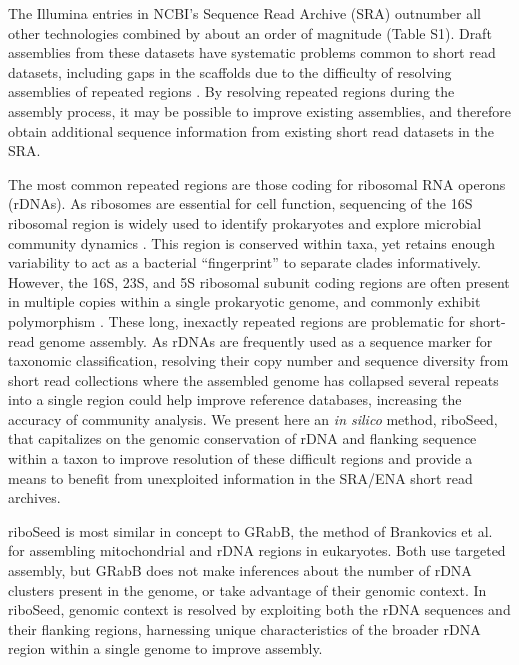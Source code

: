 The Illumina entries in NCBI's Sequence Read Archive (SRA) \cite{Kodama2012a} outnumber all other technologies combined by about an order of magnitude (Table S1). Draft assemblies from these datasets have systematic problems common to short read datasets, including gaps in the scaffolds due to the difficulty of resolving assemblies of repeated regions \cite{Whiteford2005,Treangen2011}. By resolving repeated regions during the assembly process, it may be possible to improve existing assemblies, and therefore obtain additional sequence information from existing short read datasets in the SRA.



The most common repeated regions are those coding for ribosomal RNA operons (rDNAs). As ribosomes are essential for cell function, sequencing of the 16S ribosomal region is widely used to identify prokaryotes and explore microbial community dynamics \cite{Weisburg1991,Clarridge2004,Woese1990,Case2007}. This region is conserved within taxa, yet retains enough variability to act as a bacterial ``fingerprint'' to separate clades informatively. However, the 16S, 23S, and 5S ribosomal subunit coding regions are often present in multiple copies within a single prokaryotic genome, and commonly exhibit polymorphism \cite{Coenye2003,Moreno2002,Lukjancenko2010,Vetrovsky2013}. These long, inexactly repeated regions \cite{Alkan2011} are problematic for short-read genome assembly. As rDNAs are frequently used as a sequence marker for taxonomic classification, resolving their copy number and sequence diversity from short read collections where the assembled genome has collapsed several repeats into a single region could help improve reference databases, increasing the accuracy of community analysis. We present here an \textit{in silico} method, riboSeed, that capitalizes on the genomic conservation of rDNA and flanking sequence within a taxon to improve resolution of these difficult regions and provide a means to benefit from unexploited information in the SRA/ENA short read archives.


riboSeed is most similar in concept to GRabB, the method of Brankovics et al. \cite{Brankovics2016} for assembling mitochondrial and rDNA regions in eukaryotes. Both use targeted assembly, but GRabB does not make inferences about the number of rDNA clusters present in the genome, or take advantage of their genomic context. In riboSeed, genomic context is resolved by exploiting both the rDNA sequences and their flanking regions, harnessing unique characteristics of the broader rDNA region within a single genome to improve assembly.


